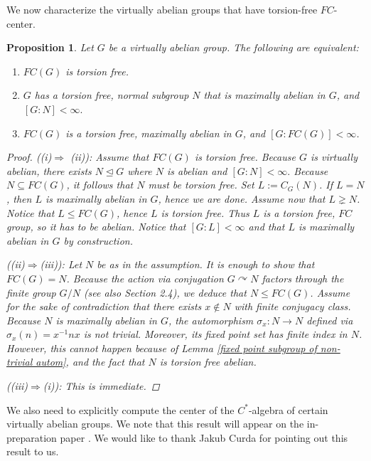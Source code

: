 \documentclass[11pt, twoside]{amsart}
\newtheorem{prop}[thm]{Proposition}
\theoremstyle{definition}
\begin{document}
We now characterize the virtually abelian groups that have torsion-free $FC$-center. 
\begin{prop}\label{characterization of tf fc center}
    Let $G$ be a virtually abelian group. The following are equivalent:
    \begin{enumerate}[label=(\roman*).]
        \item $FC(G)$ is torsion free.
        \item $G$ has a torsion free, normal subgroup $N$ that is maximally abelian in $G$, and $[G:N]<\infty.$
        \item $FC(G)$ is a torsion free, maximally abelian in $G$, and $[G:FC(G)]<\infty$.
    \end{enumerate}
    \begin{proof}
        {\em ((i)$\Rightarrow$ (ii))}: Assume that $FC(G)$ is torsion free. Because $G$ is virtually abelian, there exists $N\unlhd G$ where $N$ is abelian and $[G:N]<\infty.$ Because $N\subseteq FC(G)$, it follows that $N$ must be torsion free. Set $L:=C_G(N)$. If $L=N$, then $L$ is maximally abelian in $G$, hence we are done. Assume now that $L\gneq N$. Notice that $L\leq FC(G)$, hence $L$ is torsion free. Thus $L$ is a torsion free, $FC$ group, so it has to be abelian. Notice that $[G:L]<\infty$ and that $L$ is maximally abelian in $G$ by construction. \par
        {\em ((ii)$\Rightarrow$(iii))}: Let $N$ be as in the assumption. It is enough to show that $FC(G)=N$. Because the action via conjugation $G\curvearrowright N$ factors through the finite group $G/N$ (see also Section 2.4), we deduce that  $N\leq FC(G)$. Assume for the sake of contradiction that there exists $x\notin N$ with finite conjugacy class. Because $N$ is maximally abelian in $G$, the automorphism $\sigma_x:N\to N$ defined via $\sigma_x(n)=x^{-1}nx$ is not trivial. Moreover, its fixed point set has finite index in $N$. However, this cannot happen because of Lemma \ref{fixed point subgroup of non-trivial autom}, and the fact that $N$ is torsion free abelian. \par
        {\em ((iii)$\Rightarrow$(i))}: This is immediate.
    \end{proof}
\end{prop}
We also need to explicitly compute the center of the $C^*$-algebra of certain virtually abelian groups. We note that this result will appear on the in-preparation paper \cite{Knubyetal}. We would like to thank Jakub Curda for pointing out this result to us.
\end{document}
